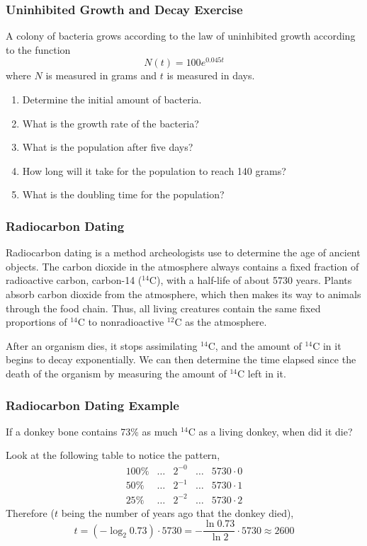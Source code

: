 \documentclass[xcolor=dvipsnames]{beamer}
\begin{document}
\begin{frame}
  \frametitle{Uninhibited Growth and Decay Exercise}
A colony of bacteria grows according to the law of uninhibited growth
according to the function
\begin{equation}
  \label{eq:chiowezo}
  N(t)=100e^{0.045t}
\end{equation}
where $N$ is measured in grams and $t$ is measured in days.
  \begin{enumerate}
  \item Determine the initial amount of bacteria.
  \item What is the growth rate of the bacteria?
  \item What is the population after five days?
  \item How long will it take for the population to reach 140
    grams?
  \item What is the doubling time for the population?
  \end{enumerate}
\end{frame}

\begin{frame}
  \frametitle{Radiocarbon Dating}
Radiocarbon dating is a method archeologists use to determine the age
of ancient objects. The carbon dioxide in the atmosphere always
contains a fixed fraction of radioactive carbon, carbon-14 ($^{14}$C),
with a half-life of about 5730 years. Plants absorb carbon dioxide
from the atmosphere, which then makes its way to animals through the
food chain. Thus, all living creatures contain the same fixed
proportions of $^{14}$C to nonradioactive $^{12}$C as the atmosphere.

\medskip

After an organism dies, it stops assimilating $^{14}$C, and the amount
of $^{14}$C in it begins to decay exponentially. We can then determine
the time elapsed since the death of the organism by measuring the
amount of $^{14}$C left in it.
\end{frame}

\begin{frame}
  \frametitle{Radiocarbon Dating Example}
If a donkey bone contains 73\% as much $^{14}$C as a living donkey,
when did it die?

\medskip

Look at the following table to notice the pattern,
\begin{equation}
  \label{eq:sayeeziu}
  \begin{array}{rcccl}
        100\% & \ldots & 2^{-0} & \ldots & 5730\cdot{}0 \\
        50\% & \ldots & 2^{-1} & \ldots & 5730\cdot{}1 \\
        25\% & \ldots & 2^{-2} & \ldots & 5730\cdot{}2
  \end{array}
\end{equation}
Therefore ($t$ being the number of years ago that the donkey died),
\begin{equation}
  \label{eq:anuvuama}
  t=\left(-\log_{2}0.73\right)\cdot{}5730=-\frac{\ln{}0.73}{\ln{}2}\cdot{}5730\approx{}2600
\end{equation}
\end{frame}
\end{document}

